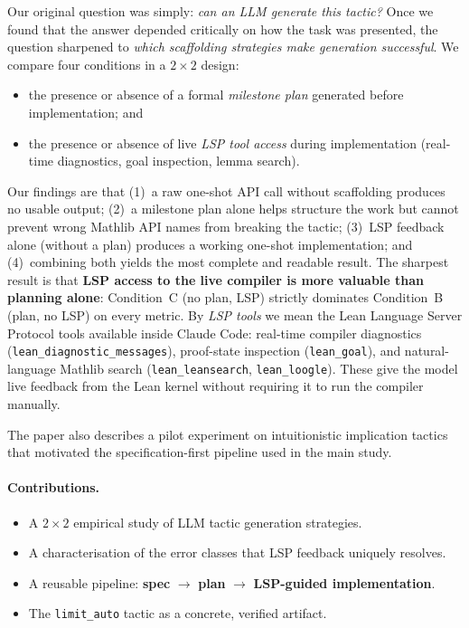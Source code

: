 \documentclass{llncs}
\begin{document}
Our original question was simply: \emph{can an LLM generate this tactic?}
Once we found that the answer depended critically on how the task was presented,
the question sharpened to \emph{which scaffolding strategies make generation successful}.
We compare four conditions in a $2 \times 2$ design:
\begin{itemize}
  \item the presence or absence of a formal \emph{milestone plan} generated
        before implementation; and
  \item the presence or absence of live \emph{LSP tool access} during
        implementation (real-time diagnostics, goal inspection, lemma search).
\end{itemize}

Our findings are that (1)~a raw one-shot API call without scaffolding produces
no usable output; (2)~a milestone plan alone helps structure the work but
cannot prevent wrong Mathlib API names from breaking the tactic; (3)~LSP
feedback alone (without a plan) produces a working one-shot implementation;
and (4)~combining both yields the most complete and readable result.
The sharpest result is that \textbf{LSP access to the live compiler is more
valuable than planning alone}: Condition~C (no plan, LSP) strictly dominates
Condition~B (plan, no LSP) on every metric.
By \emph{LSP tools} we mean the Lean Language Server Protocol tools available inside
Claude Code: real-time compiler diagnostics (\texttt{lean\_diagnostic\_messages}),
proof-state inspection (\texttt{lean\_goal}), and natural-language Mathlib
search (\texttt{lean\_leansearch}, \texttt{lean\_loogle}).
These give the model live feedback from the Lean kernel without requiring it to
run the compiler manually.

The paper also describes a pilot experiment on intuitionistic implication
tactics that motivated the specification-first pipeline used in the main study.

\paragraph{Contributions.}
\begin{itemize}
  \item A $2 \times 2$ empirical study of LLM tactic generation strategies.
  \item A characterisation of the error classes that LSP feedback uniquely resolves.
  \item A reusable pipeline: \textbf{spec} $\to$ \textbf{plan} $\to$
        \textbf{LSP-guided implementation}.
  \item The \texttt{limit\_auto} tactic as a concrete, verified artifact.
\end{itemize}
\end{document}
